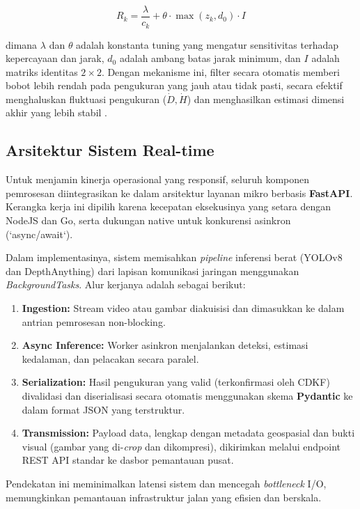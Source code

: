 \begin{equation}
R_k = \frac{\lambda}{c_k} + \theta \cdot \max(z_k, d_0) \cdot I
\end{equation}

dimana $\lambda$ dan $\theta$ adalah konstanta tuning yang mengatur sensitivitas terhadap kepercayaan dan jarak, $d_0$ adalah ambang batas jarak minimum, dan $I$ adalah matriks identitas $2 \times 2$. Dengan mekanisme ini, filter secara otomatis memberi bobot lebih rendah pada pengukuran yang jauh atau tidak pasti, secara efektif menghaluskan fluktuasi pengukuran ($\dot{D}, \dot{H}$) dan menghasilkan estimasi dimensi akhir yang lebih stabil \cite{rahman2025}.

\subsection{Arsitektur Sistem Real-time}
Untuk menjamin kinerja operasional yang responsif, seluruh komponen pemrosesan diintegrasikan ke dalam arsitektur layanan mikro berbasis \textbf{FastAPI}. Kerangka kerja ini dipilih karena kecepatan eksekusinya yang setara dengan NodeJS dan Go, serta dukungan native untuk konkurensi asinkron (`async/await`).

Dalam implementasinya, sistem memisahkan \textit{pipeline} inferensi berat (YOLOv8 dan DepthAnything) dari lapisan komunikasi jaringan menggunakan \textit{BackgroundTasks}. Alur kerjanya adalah sebagai berikut:
\begin{enumerate}
    \item \textbf{Ingestion:} Stream video atau gambar diakuisisi dan dimasukkan ke dalam antrian pemrosesan non-blocking.
    \item \textbf{Async Inference:} Worker asinkron menjalankan deteksi, estimasi kedalaman, dan pelacakan secara paralel.
    \item \textbf{Serialization:} Hasil pengukuran yang valid (terkonfirmasi oleh CDKF) divalidasi dan diserialisasi secara otomatis menggunakan skema \textbf{Pydantic} ke dalam format JSON yang terstruktur.
    \item \textbf{Transmission:} Payload data, lengkap dengan metadata geospasial dan bukti visual (gambar yang di-\textit{crop} dan dikompresi), dikirimkan melalui endpoint REST API standar ke dasbor pemantauan pusat.
\end{enumerate}

Pendekatan ini meminimalkan latensi sistem dan mencegah \textit{bottleneck} I/O, memungkinkan pemantauan infrastruktur jalan yang efisien dan berskala.
